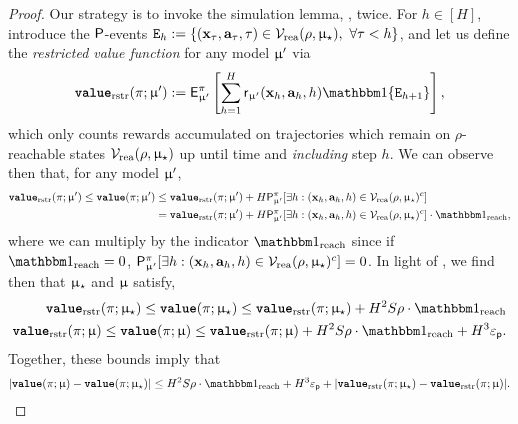 \begin{proof}

Our strategy is to invoke the simulation lemma, , twice.  For $h \in [H]$, introduce the $\mathsf{P}$-events $\texttt{E}_h := \{(\mathbf{x}_\tau,\mathbf{a}_{\tau},\tau) \in \mathcal{V}_{\mathrm{rea}}(\rho,\upmu_{\star}),~ \forall \tau < h\}$, and let us define the \emph{restricted value function} for any model $\upmu'$ via
\begin{align}
\valuefrest{\pi}{\model'} := \sfE^{\pi}_{\model'}\left[\sum_{h=1}^H \sfr_{\model'}(\bmx_h,\bma_h,h) \ind\{\scrE_{h+1}\}\right],
\end{align}
which only counts rewards accumulated on trajectories which remain on $\rho$-reachable states $\mathcal{V}_{\mathrm{rea}}(\rho,\upmu_{\star})$ up until time and \emph{including} step $h$. We can observe then that, for any model $\upmu'$,
\begin{align*}
\valuefrest{\pi}{\model'} \le \valuef{\pi}{\model'} &\le \valuefrest{\pi}{\model'}  +  H\sfP^{\pi}_{\model'}[\exists h: (\bmx_h,\bma_h,h) \in \Vreach(\rho,\modst)^c ]\\
&= \valuefrest{\pi}{\model'}  +  H\sfP^{\pi}_{\model'}[\exists h: (\bmx_h,\bma_h,h) \in \Vreach(\rho,\modst)^c ] \cdot \indreach,
\end{align*}
where we can multiply by the indicator $\indreach$ since if $\indreach = 0$,  $\mathsf{P}^{\pi}_{\upmu'}[\exists h: (\mathbf{x}_h,\mathbf{a}_h,h) \in \mathcal{V}_{\mathrm{rea}}(\rho,\upmu_{\star})^c ]  = 0$. In light of , we find then that $\upmu_{\star}$ and $\upmu$ satisfy,
\begin{align*}
\valuefrest{\pi}{\modst} \le \valuef{\pi}{\modst} \le \valuefrest{\pi}{\modst}  +  H^2 S \rho \cdot \indreach \\
\valuefrest{\pi}{\model} \le \valuef{\pi}{\model} \le \valuefrest{\pi}{\model}  +  H^2 S \rho \cdot \indreach + H^3 \epsp.
\end{align*}
Together, these bounds imply that
\begin{align}\label{eq:value_diff_inter_rest}
 |\valuef{\pi}{\model}  - \valuef{\pi}{\modst}| \le  H^2 S \rho \cdot \indreach + H^3 \epsp + |\valuefrest{\pi}{\modst} - \valuefrest{\pi}{\model}|.
\end{align}


\end{proof}
